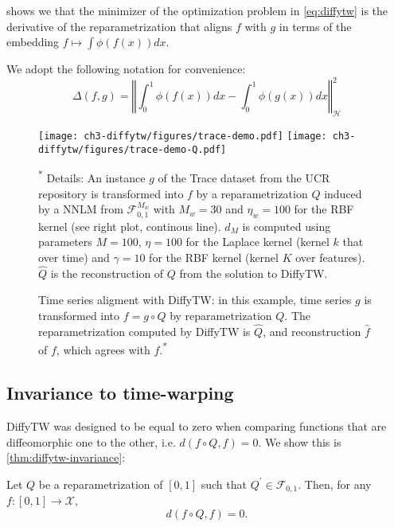 \noindent {} shows we that the minimizer of the optimization problem in \cref{eq:diffytw} is the derivative of the reparametrization that aligns $f$ with $g$ in terms of the embedding $f \mapsto \int \phi(f(x))dx$.

We adopt the following notation for convenience:
\begin{equation}\label{def:diffytw-delta}
\Delta(f , g) = \left\Vert \int_0^1 \phi(f(x))dx - \int_0^1\phi(g(x))dx\right\Vert^2_\mathcal H
\end{equation}

\begin{figure}[ht!]
\begin{center}
\texttt{[image: ch3-diffytw/figures/trace-demo.pdf]}
\texttt{[image: ch3-diffytw/figures/trace-demo-Q.pdf]}
\end{center}
\caption[Time series alignment with DiffyTW]{Time series aligment with DiffyTW: in this example, time series $g$ is transformed into $f=g\circ Q$ by reparametrization $Q$. The reparametrization computed by DiffyTW is $\hat Q$, and reconstruction $\hat f$ of $f$, which agrees with $f$.\textsuperscript{*}}
\small\textsuperscript{*} Details: An instance $g$ of the Trace dataset from the UCR repository is transformed into $f$ by a reparametrization $Q$ induced by a NNLM from $\mathcal F_{0,1}^{M_w}$ with $M_{w}=30$ and $\eta_w= 100$ for the RBF kernel (see right plot, continous line). $\hat d_M$ is computed using parameters $M=100$, $\eta =100$ for the Laplace kernel (kernel $k$ that over time) and $\gamma=10$ for the RBF kernel (kernel $K$ over features). $\hat Q$ is the reconstruction of $Q$ from the solution to DiffyTW.
\end{figure}

\subsection{Invariance to time-warping}
DiffyTW was designed to be equal to zero when comparing functions that are diffeomorphic one to the other, i.e. $d(f\circ Q, f)=0$. We show this is \cref{thm:diffytw-invariance}:


\begin{theorem}\label{thm:diffytw-invariance}
Let $Q$ be a reparametrization of $[0,1]$ such that $Q^\prime \in \mathcal F_{0, 1}$. Then, for any $f: [0,1] \to \mathcal X$,
\begin{equation}
    d(f\circ Q, f) = 0.
\end{equation}
\end{theorem}

